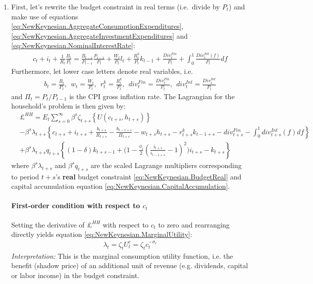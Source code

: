 \begin{enumerate}
\item First, let's rewrite the budget constraint in real terms (i.e.\ divide by $P_t$)
  and make use of equations \eqref{eq:NewKeynesian.AggregateConsumptionExpenditures}, \eqref{eq:NewKeynesian.AggregateInvestmentExpenditures} and \eqref{eq:NewKeynesian.NominalInterestRate}:
\begin{align}
c_t + i_t + \frac{1}{R_t} \frac{B_t}{P_t} = \frac{B_{t-1}}{P_{t-1}} \frac{P_{t-1}}{P_t} + \frac{W_t}{P_t} l_t + \frac{R^k_t}{P_t} k_{t-1} + \frac{Div^{Fin}_t}{P_t} + \int_0^1 \frac{Div^{Int}_t(f)}{P_t} df \label{eq:NewKeynesian.BudgetReal}
\end{align}
Furthermore, let lower case letters denote real variables, i.e.\
\begin{align*}
b_t=\frac{B_t}{P_t},~~ w_t=\frac{W_t}{P_t},~~ r^k_t = \frac{R^k_t}{P_t},~~ div^{Fin}_t = \frac{Div^{Fin}_t}{P_t},~~ div^{Int}_t = \frac{Div^{Int}_t}{P_t}
\end{align*} 
  and $\Pi_t=P_t/P_{t-1}$ is the CPI gross inflation rate.
The Lagrangian for the household's problem is then given by:
\begin{align*}
&\pounds^{HH} = E_t \sum_{s=0}^{\infty} \beta^s \zeta_{t+s} \left\{	U\left({c}_{t+s},h_{t+s}\right) \right\}
\\
& - \beta^s \lambda_{t+s} \left\{
  c_{t+s}
+ i_{t+s}
+ \frac{b_{t+s}}{{R}_{t+s}}
- \frac{b_{t-1+s}}{\Pi_{t+s}}
- w_{t+s} h_{t+s}
- r^k_{t+s} k_{t-1+s}
- div^{Fin}_{t+s}
- \int_0^1 div^{Int}_{t+s}(f) df
\right\}
\\
& + \beta^s \lambda_{t+s} q_{t+s} \left\{ (1-\delta) k_{t+s-1} + \Biggl( 1 - \frac{\phi_i}{2} \left(\frac{i_{t+s}}{i_{t-1+s}} - 1 \right)^2 \Biggr) i_{t+s} - k_{t+s}  \right\}
\end{align*}
where $\beta^s\lambda_{t+s}$ and $\beta^s q_{t+s}$ are the scaled Lagrange multipliers
  corresponding to period $t+s$'s \textbf{real} budget constraint \eqref{eq:NewKeynesian.BudgetReal} and capital accumulation equation \eqref{eq:NewKeynesian.CapitalAccumulation}.

\paragraph{First-order condition with respect to $c_t$}
Setting the derivative of $\pounds^{HH}$ with respect to $c_t$ to zero and rearranging directly yields equation \eqref{eq:NewKeynesian.MarginalUtility}:
\begin{align*}
	\lambda_t = \zeta_t U^c_t = \zeta_t c_t^{-\sigma_c}
\end{align*}
\emph{Interpretation:} This is the marginal consumption utility function,
i.e. the benefit (shadow price) of an additional unit of revenue (e.g. dividends, capital or labor income) in the budget constraint.


\end{enumerate}

